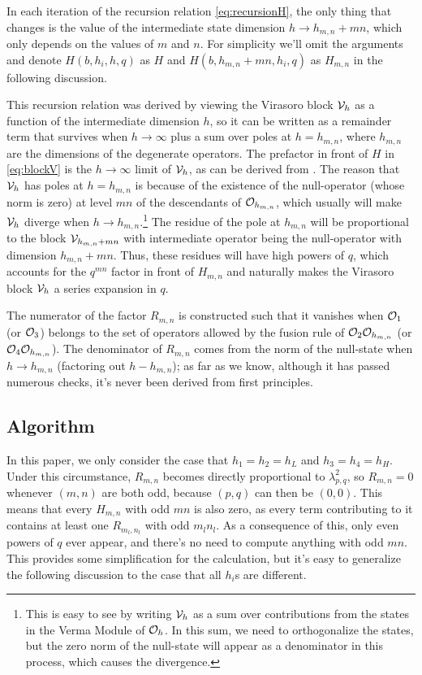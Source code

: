 In each iteration of the recursion relation \ref{eq:recursionH}, the only thing that changes is the value of the intermediate state dimension $h\rightarrow h_{m,n}+mn$, which only depends on the values of $m$ and $n$. For simplicity we'll omit the arguments and denote $H(b,h_i,h,q)$ as $H$ and $H(b,h_{m,n}+mn,h_i,q)$ as $H_{m,n}$ in the following discussion.

This recursion relation was derived by viewing the Virasoro block ${\cal V}_h$ as a function of the intermediate dimension $h$, so it can be written as a remainder term that survives when $h\rightarrow \infty$ plus a sum over poles at $h=h_{m,n}$, where $h_{m,n}$ are the dimensions of the degenerate operators. The prefactor in front of $H$ in \ref{eq:blockV} is the $h\rightarrow \infty$ limit of ${\cal V}_h$, as can be derived from \cite{ZamolodchikovRecursion, Zamolodchikovq, Zamolodchikov:1986gh}. The reason that ${\cal V}_h$ has poles at $h=h_{m,n}$ is because of the existence of the null-operator (whose norm is zero) at level $mn$ of the descendants of ${\cal O}_{h_{m,n}}$, which usually will make ${\cal V}_h$ diverge when $h\rightarrow h_{m,n}$.\footnote{This is easy to see by writing ${\cal V}_h$ as a sum over contributions from the states in the Verma Module of ${\cal O}_h$. In this sum, we need to orthogonalize the states, but the zero norm of the null-state will appear as a denominator in this process, which causes the divergence.} The residue of the pole at $h_{m,n}$ will be proportional to the block ${\cal V}_{h_{m,n}+mn}$ with  intermediate operator being the null-operator with dimension $h_{m,n}+mn$. Thus, these residues will have high powers of $q$, which accounts for the $q^{mn}$ factor in front of $H_{m,n}$ and naturally makes the Virasoro block ${\cal V}_h$ a series expansion in $q$.  
   
The numerator of the factor $R_{m,n}$ is constructed such that it vanishes when ${\cal O}_{1}$ (or ${\cal O}_{3}$) belongs to the set of operators allowed by the fusion rule of ${\cal O}_2{\cal O}_{h_{m,n}}$ (or ${\cal O}_4{\cal O}_{h_{m,n}}$). The denominator of $R_{m,n}$ comes from the norm of the null-state when $h\rightarrow h_{m,n}$ (factoring out $h-h_{m,n}$); as far as we know, although it has passed numerous checks, it's never been derived from first principles. 
 
\subsection{Algorithm}
In this paper, we only consider the case that $h_1 = h_2 =h_L$ and $h_3 = h_4 = h_H$. Under this circumstance, $R_{m,n}$ becomes directly proportional to $\lambda_{p,q}^2$, so $R_{m,n} = 0$ whenever $(m,n)$ are both odd, because $(p,q)$ can then be $(0,0)$. This means that every $H_{m,n}$ with odd $mn$ is also zero, as every term contributing to it contains at least one $R_{m_l,n_l}$ with odd $m_ln_l$. As a consequence of this, only even powers of $q$ ever appear, and there's no need to compute anything with odd $mn$. This provides some simplification for the calculation, but it's easy to generalize the following discussion to the case that all $h_i$s are different.

